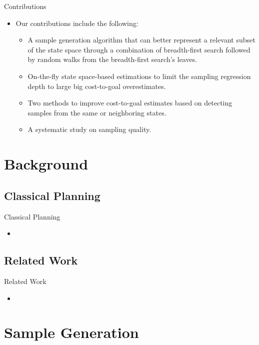 \documentclass{gkibeamer}
\begin{document}
\begin{frame}{Contributions}
\begin{itemize}
    \item Our contributions include the following:
    \begin{itemize}
        \pause
        \item A sample generation algorithm that can better represent a relevant subset of the state space through a combination of breadth-first search followed by random walks from the breadth-first search’s leaves.
        \pause
        \item On-the-fly state space-based estimations to limit the sampling regression depth to large big cost-to-goal overestimates.
        \pause
        \item Two methods to improve cost-to-goal estimates based on detecting samples from the same or neighboring states.
        \pause
        \item A systematic study on sampling quality.
    \end{itemize}
\end{itemize}
\end{frame}

\section{Background}

\subsection{Classical Planning}

\begin{frame}{Classical Planning}
\begin{itemize}
    \item 
\end{itemize}
\end{frame}

\subsection{Related Work}

\begin{frame}{Related Work}
\begin{itemize}
    \item 
\end{itemize}
\end{frame}

\section{Sample Generation}
\end{document}
